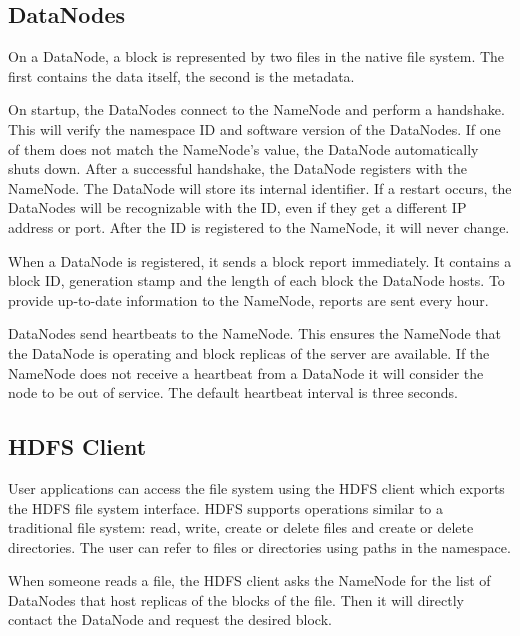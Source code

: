 \subsection{DataNodes \cite{Shvachko:2010:HDF:1913798.1914427}}
On a DataNode, a block is represented by two files in the native file system. The first contains the data itself, the second is the metadata.

On startup, the DataNodes connect to the NameNode and perform a handshake. This will verify the namespace ID and software version of the DataNodes. If one of them does not match the NameNode's value, the DataNode automatically shuts down. After a successful handshake, the DataNode registers with the NameNode. The DataNode will store its internal identifier. If a restart occurs, the DataNodes will be recognizable with the ID, even if they get a different IP address or port. After the ID is registered to the NameNode, it will never change. 

 When a DataNode is registered, it sends a block report immediately. It contains a block ID, generation stamp and the length of each block the DataNode hosts. To provide up-to-date information to the NameNode, reports are sent every hour. 

DataNodes send heartbeats to the NameNode. This ensures the NameNode that the DataNode is operating and block replicas of the server are available. If the NameNode does not receive a heartbeat from a DataNode it will consider the node to be out of service. The default heartbeat interval is three seconds.

\subsection{HDFS Client \cite{Shvachko:2010:HDF:1913798.1914427}}
User applications can access the file system using the HDFS client which exports the HDFS file system interface. HDFS supports operations similar to a traditional file system: read, write, create or delete files and create or delete directories. The user can refer to files or directories using paths in the namespace.

When someone reads a file, the HDFS client asks the NameNode for the list of DataNodes that host replicas of the blocks of the file. Then it will directly contact the DataNode and request the desired block.

